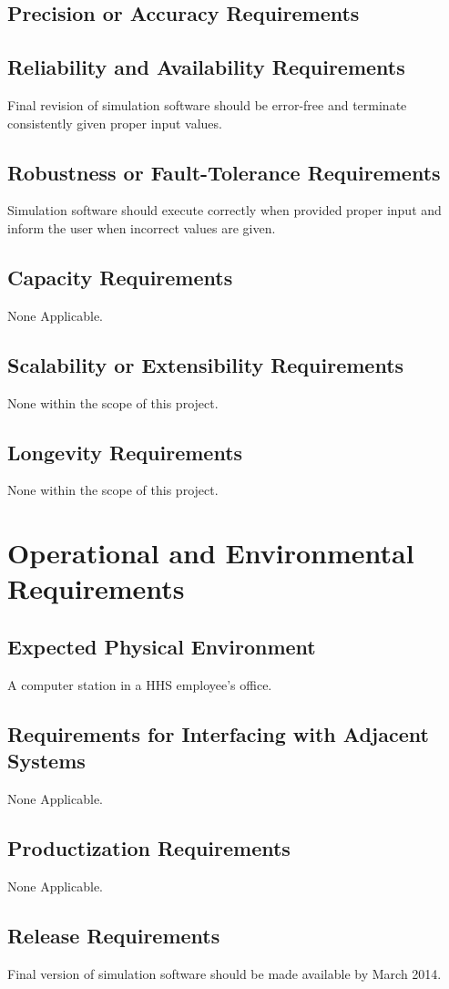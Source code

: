 \documentclass[paper=letter, fontsize=10pt]{scrartcl}
\numberwithin{equation}{section}		%
\numberwithin{figure}{section}			%
\numberwithin{table}{section}				%
\begin{document}
\subsection{Precision or Accuracy Requirements}

\subsection{Reliability and Availability Requirements}
Final revision of simulation software should be error-free and terminate consistently given proper input values.
\subsection{Robustness or Fault-Tolerance Requirements}
Simulation software should execute correctly when provided proper input and inform the user when incorrect values are given.
\subsection{Capacity Requirements}
None Applicable.
\subsection{Scalability or Extensibility Requirements}
None within the scope of this project.
\subsection{Longevity Requirements}
None within the scope of this project.

\section{Operational and Environmental Requirements}
\subsection{Expected Physical Environment}
A computer station in a HHS employee's office.
\subsection{Requirements for Interfacing with Adjacent Systems}
None Applicable.
\subsection{Productization Requirements}
None Applicable.
\subsection{Release Requirements}
Final version of simulation software should be made available by March 2014.
\end{document}
